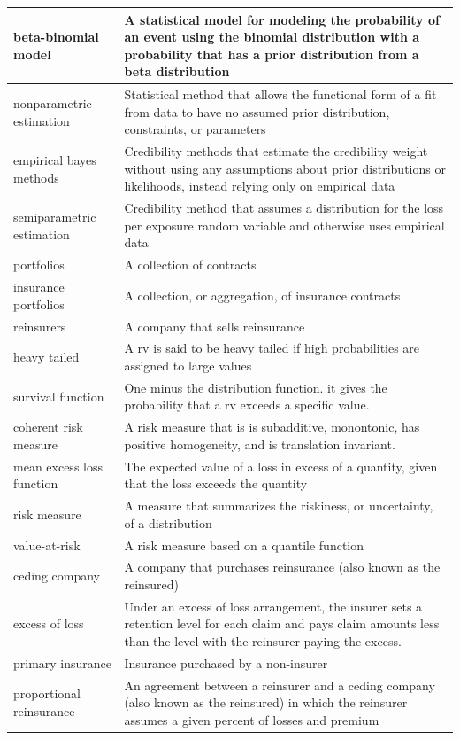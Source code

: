 \documentclass[
]{book}
\begin{document}
\begin{longtable}{>{\raggedright\arraybackslash}p{10em}|>{\raggedright\arraybackslash}p{30em}}
\hline
beta-binomial model & A statistical model for modeling the probability of an event using the binomial distribution with a probability that has a prior distribution from a beta distribution\\
\hline
nonparametric estimation & Statistical method that allows the functional form of a fit from data to have no assumed prior distribution, constraints, or parameters\\
\hline
empirical bayes methods & Credibility methods that estimate the credibility weight without using any assumptions about prior distributions or likelihoods, instead relying only on empirical data\\
\hline
semiparametric estimation & Credibility method that assumes a distribution for the loss per exposure random variable and otherwise uses empirical data\\
\hline
portfolios & A collection of contracts\\
\hline
insurance portfolios & A collection, or aggregation, of insurance contracts\\
\hline
reinsurers & A company that sells reinsurance\\
\hline
heavy tailed & A rv is said to be heavy tailed if high probabilities are assigned to large values\\
\hline
survival function & One minus the distribution function. it gives the probability that a rv exceeds a specific value.\\
\hline
coherent risk measure & A risk measure that is is subadditive, monontonic, has positive homogeneity, and is translation invariant.\\
\hline
mean excess loss function & The expected value of a loss in excess of a quantity, given that the loss exceeds the quantity\\
\hline
risk measure & A measure that summarizes the riskiness, or uncertainty, of a distribution\\
\hline
value-at-risk & A risk measure based on a quantile function\\
\hline
ceding company & A company that purchases reinsurance (also known as the reinsured)\\
\hline
excess of loss & Under an excess of loss arrangement, the insurer sets a retention level for each claim and pays claim amounts less than the level with the reinsurer paying the excess.\\
\hline
primary insurance & Insurance purchased by a non-insurer\\
\hline
proportional reinsurance & An agreement between a reinsurer and a ceding company (also known as the reinsured) in which the reinsurer assumes a given percent of losses and premium\\

\end{longtable}
\end{document}
